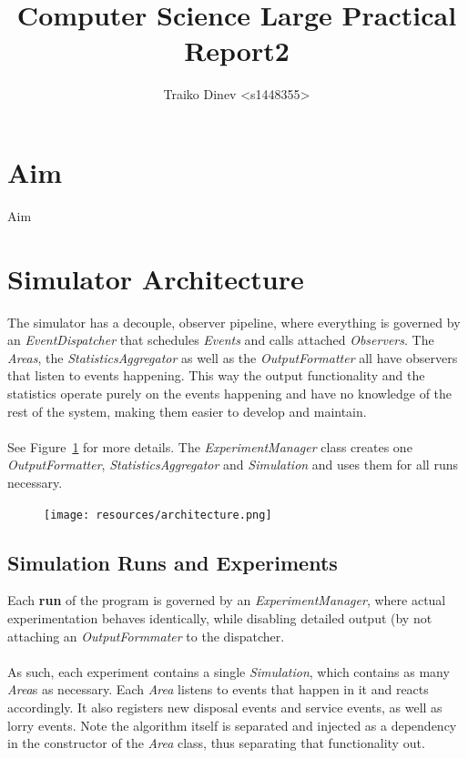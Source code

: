 \documentclass{article}
\title{Computer Science Large Practical Report2}
\date{}
\author{Traiko Dinev \textless s1448355\textgreater}
\begin{document}
	\maketitle

    \section{Aim}
		Aim
	
	\section{Simulator Architecture}
		The simulator has a decouple, observer pipeline, where everything is governed by an \textit{EventDispatcher} that schedules
		\textit{Events} and calls attached \textit{Observers}. The \textit{Areas}, the \textit{StatisticsAggregator} as well as the
		\textit{OutputFormatter} all have observers that listen to events happening. This way the output functionality and the statistics
		operate purely on the events happening and have no knowledge of the rest of the system, making them easier to develop and maintain.
		\\ \\
		See Figure~\ref{fig:fig1} for more details. The \textit{ExperimentManager} class creates one \textit{OutputFormatter}, \textit{StatisticsAggregator}
		and \textit{Simulation} and uses them for all runs necessary.

		\begin{figure}[H]
		\centering
			\texttt{[image: resources/architecture.png]}
			\label{fig:fig1} 
		\end{figure}

	\subsection{Simulation Runs and Experiments}
		Each \textbf{run} of the program is governed by an \textit{ExperimentManager}, where actual experimentation behaves identically, while
		disabling detailed output (by not attaching an \textit{OutputFormmater} to the dispatcher.
		\\
		\\
		As such, each experiment contains a single \textit{Simulation}, which contains as many \textit{Area}s as necessary.
		Each \textit{Area} listens to events that happen in it and reacts accordingly. It also registers new disposal events and service events,
		as well as lorry events. Note the algorithm itself is separated and injected as a dependency in the constructor of the \textit{Area} class, thus
		separating that functionality out.
\end{document}
